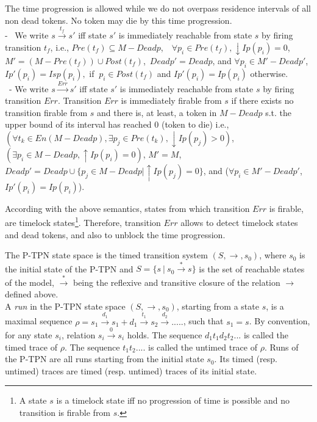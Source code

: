 \documentclass[submission,copyright,creativecommons]{eptcs}
\numberwithin{equation}{section}
\begin{document}
The time progression is allowed while we do not overpass residence intervals of all non dead tokens. No token may die by this time progression.\\
- \ We write \(s \overset{t_f}\rightarrow s'\) iff  state \(s'\) is immediately
reachable from state \(s\) by firing transition \(t_f\), i.e.,
\(Pre(t_f) \subseteq M-Deadp\),\ \ \( \forall p_i \in Pre(t_f),  {\downarrow Ip(p_i)}=0\),
 \(M' = (M - Pre(t_f)) \cup Post(t_f)\),\ $Deadp'=Deadp$,
 and \(\forall p_i \in M'-Deadp'\), $Ip'(p_i) = Isp(p_i),$  if $ ~ p_i \in Post(t_f)$ and $Ip'(p_i) =
 Ip(p_i)$ otherwise.\\
 \ - We write \(s \overset{Err}\rightarrow s'\) iff  state \(s'\) is immediately
reachable from state \(s\) by firing transition \(Err\). Transition $Err$ is immediately firable from $s$ if there exists no transition firable from $s$ and there is, at least, a token in $M-Deadp$ s.t. the upper bound of its interval has reached $0$ (token to die) i.e., \((\forall t_k \in En(M-Deadp), \exists p_j \in Pre(t_k),   {\downarrow Ip(p_j)}>0 ) \), \((\exists p_i \in M-Deadp, {\uparrow Ip(p_i)} = 0)\),
 \(M' = M\), $Deadp'=Deadp \cup \{ p_j \in M-Deadp | {\uparrow Ip(p_j)}=0 \}$,
 and (\(\forall p_i \in M' - Deadp'\), $Ip'(p_i) = Ip(p_i)$).
\par According with the above semantics, states from which transition $Err$ is firable, are timelock states\footnote{A state $s$ is a timelock state iff no progression of time is possible and no transition is firable from $s$.}. Therefore, transition $Err$ allows to detect timelock states and dead tokens, and also to unblock the time progression.
\par The P-TPN state space is the timed transition system \((S, \rightarrow,
s_{0})\), where \(s_{0}\) is the initial state of
the P-TPN and \(S = \{s \ | \ s_{0}\overset{*}\rightarrow s \}\)
 is the set of reachable states of the model, \(\overset{*}\rightarrow\) being the reflexive and transitive closure  of the relation \(\rightarrow\) defined above.\\  A \emph{run} in the  P-TPN state space \((S,\rightarrow, s_{0} ) \), starting from a state \(s\), is a maximal sequence \(\rho = s_1  \overset{d_1}\rightarrow s_1 + d_1 \overset{t_1}\rightarrow  s_{2} \overset{d_2}\rightarrow.....\), such that \(s_1=s\). By convention, for any state $s_i$, relation \(s_i \overset{0}\rightarrow s_i\) holds.
 The sequence $d_1 t_1 d_2 t_2 ...$ is called the timed trace of $\rho$. The sequence $t_1t_2....$ is called the untimed trace of $\rho$. Runs of the P-TPN are all runs starting from the initial state \(s_0\). Its timed (resp. untimed) traces are timed (resp. untimed) traces of its initial state.
\end{document}
